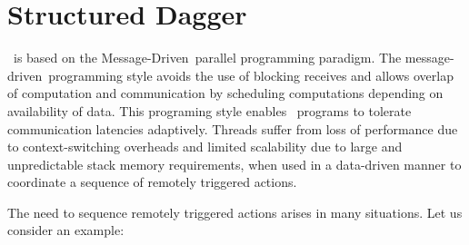 \chapter{Structured Dagger}

\newcommand{\sdag}{Structured Dagger}
\newcommand{\charm}{Charm}
\newcommand{\wb}{when-block}
\newcommand{\dagg}{Dagger}
\newcommand{\md}{message-driven}
\newcommand{\Md}{Message-driven}
\newcommand{\MD}{Message-Driven}

\charmpp\ is based on the \MD\ parallel programming paradigm.
The \md\ programming style avoids the use of blocking receives and
allows overlap of computation and communication by scheduling
computations depending on availability of data.  This programing style
enables \charmpp\ programs to
tolerate communication latencies adaptively. Threads suffer from loss of
performance due to context-switching overheads and limited scalability
due to large and unpredictable stack memory requirements, when used 
in a data-driven manner to
coordinate a sequence of remotely triggered actions.

The need to sequence remotely triggered actions
arises in many situations. Let us consider an example:

